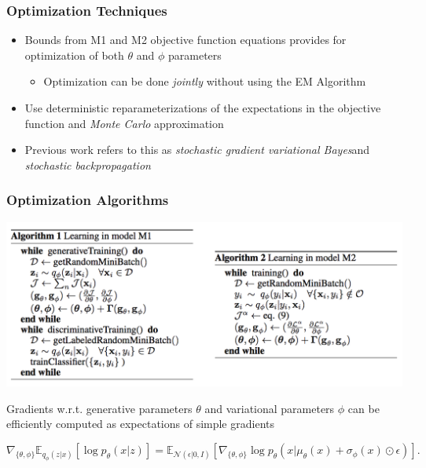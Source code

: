 \documentclass{beamer}
\begin{document}
\begin{frame}
  \frametitle{Optimization Techniques}

  \begin{itemize}
  \item Bounds from M1 and M2 objective function equations provides
    for optimization of both $\theta$ and $\phi$ parameters
    \begin{itemize}
    \item Optimization can be done \textit{jointly} without using the EM
      Algorithm
    \end{itemize}
  \item Use deterministic reparameterizations of the expectations in
    the objective function and \textit{Monte Carlo} approximation
  \item Previous work refers to this as \textit{stochastic gradient
    variational Bayes}\footnotemark and
    \textit{stochastic backpropagation}\footnotemark
  \end{itemize}


\end{frame}

\begin{frame}
  \frametitle{Optimization Algorithms}
  \includegraphics[scale=0.5]{learningModel}

  Gradients w.r.t. generative parameters $\theta$ and variational
  parameters $\phi$ can be efficiently computed as expectations of
  simple gradients\footnotemark

    \[
  \nabla_{\{\theta, \phi\}} \mathbb{E}_{q_\phi (z|x)}
        [\log p_\theta (x|z)] = \mathbb{E}_{\mathcal{N}(\epsilon | 0, I)}
        [\nabla_{\{\theta, \phi\}} \log p_\theta (x |\mu_\theta (x)
          + \sigma_\phi (x) \odot \epsilon)]. 
        \]

\end{frame}
\end{document}
